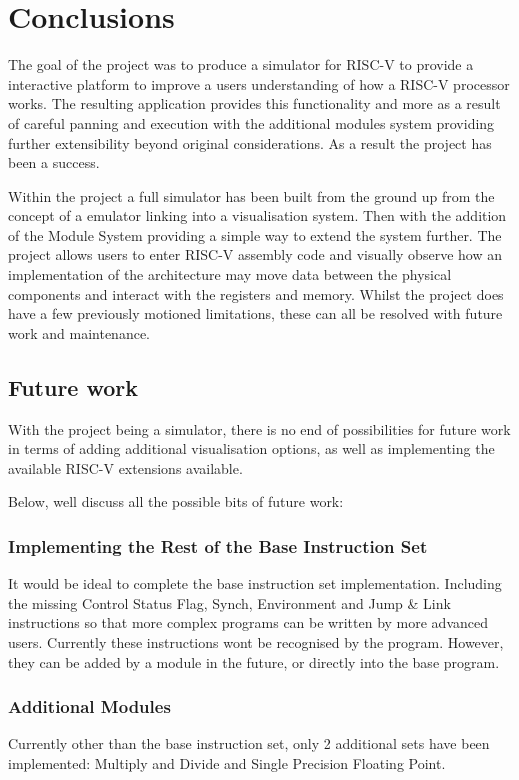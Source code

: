 \chapter{Conclusions}
\label{ch:conclusions}
The goal of the project was to produce a simulator for RISC-V \cite{riscv_2015_riscv} to provide a interactive platform to improve a users understanding of how a RISC-V processor works. The resulting application provides this functionality and more as a result of careful panning and execution with the additional modules system providing further extensibility beyond original considerations. As a result the project has been a success.

Within the project a full simulator has been built from the ground up from the concept of a emulator linking into a visualisation system. Then with the addition of the Module System providing a simple way to extend the system further. The project allows users to enter RISC-V \cite{riscv_2015_riscv} assembly code and visually observe how an implementation of the architecture may move data between the physical components and interact with the registers and memory. Whilst the project does have a few previously motioned limitations, these can all be resolved with future work and maintenance.

\section{Future work}\label{sec:future_work}
With the project being a simulator, there is no end of possibilities for future work in terms of adding additional visualisation options, as well as implementing the available RISC-V \cite{riscv_2015_riscv} extensions available.

Below, well discuss all the possible bits of future work:

\subsection{Implementing the Rest of the Base Instruction Set}
It would be ideal to complete the base instruction set implementation. Including the missing Control Status Flag, Synch, Environment and Jump \& Link instructions so that more complex programs can be written by more advanced users. Currently these instructions wont be recognised by the program. However, they can be added by a module in the future, or directly into the base program. 

\subsection{Additional Modules}
Currently other than the base instruction set, only 2 additional sets have been implemented: Multiply and Divide and Single Precision Floating Point. 

